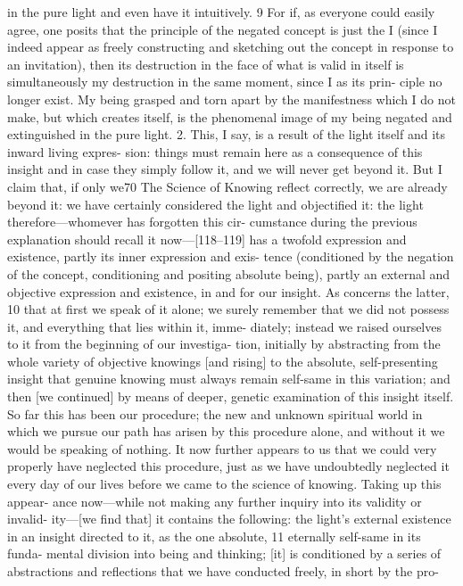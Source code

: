 in the pure light and even have it intuitively. 9 For if, as everyone could easily
agree, one posits that the principle of the negated concept is just the I (since
I indeed appear as freely constructing and sketching out the concept in
response to an invitation), then its destruction in the face of what is valid in
itself is simultaneously my destruction in the same moment, since I as its prin-
ciple no longer exist. My being grasped and torn apart by the manifestness
which I do not make, but which creates itself, is the phenomenal image of my
being negated and extinguished in the pure light.
2. This, I say, is a result of the light itself and its inward living expres-
sion: things must remain here as a consequence of this insight and in case they
simply follow it, and we will never get beyond it. But I claim that, if only we70
The Science of Knowing
reflect correctly, we are already beyond it: we have certainly considered the
light and objectified it: the light therefore—whomever has forgotten this cir-
cumstance during the previous explanation should recall it now—[118–119]
has a twofold expression and existence, partly its inner expression and exis-
tence (conditioned by the negation of the concept, conditioning and positing
absolute being), partly an external and objective expression and existence, in
and for our insight.
As concerns the latter, 10 that at first we speak of it alone; we surely
remember that we did not possess it, and everything that lies within it, imme-
diately; instead we raised ourselves to it from the beginning of our investiga-
tion, initially by abstracting from the whole variety of objective knowings [and
rising] to the absolute, self-presenting insight that genuine knowing must
always remain self-same in this variation; and then [we continued] by means
of deeper, genetic examination of this insight itself. So far this has been our
procedure; the new and unknown spiritual world in which we pursue our path
has arisen by this procedure alone, and without it we would be speaking of
nothing. It now further appears to us that we could very properly have
neglected this procedure, just as we have undoubtedly neglected it every day
of our lives before we came to the science of knowing. Taking up this appear-
ance now—while not making any further inquiry into its validity or invalid-
ity—[we find that] it contains the following: the light’s external existence in
an insight directed to it, as the one absolute, 11 eternally self-same in its funda-
mental division into being and thinking; [it] is conditioned by a series of
abstractions and reflections that we have conducted freely, in short by the pro-
